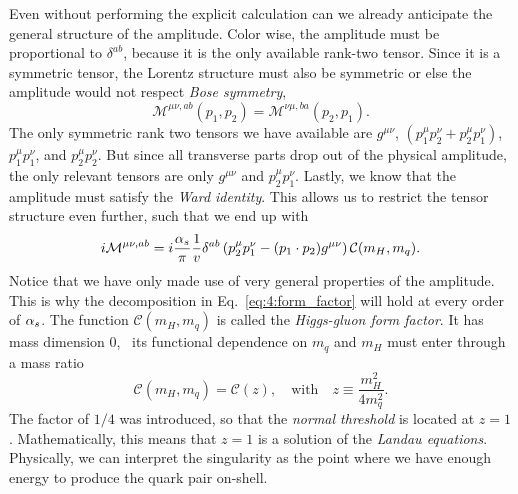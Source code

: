 Even without performing the explicit calculation can we already anticipate the general structure of the amplitude. Color wise, the amplitude must be proportional to $\delta^{ab}$, because it is the only available rank-two tensor. Since it is a symmetric tensor, the Lorentz structure must also be symmetric or else the amplitude would not respect \textit{Bose symmetry}, \ie\
\begin{equation}
\mathcal{M}^{\mu \nu, ab} (p_1, p_2) = \mathcal{M}^{\nu \mu, ba } (p_2, p_1).
\end{equation}
The only symmetric rank two tensors we have available are $g^{\mu\nu}$, $(p_1^\mu p_2^\nu + p_2^\mu p_1^\nu)$, $p_1^\mu p_1^\nu$, and $p_2^\mu p_2^\nu$. But since all transverse parts drop out of the physical amplitude, the only relevant tensors are only $g^{\mu \nu}$ and $p_2^\mu p_1^\nu$. Lastly, we know that the amplitude must satisfy the \textit{Ward identity}. This allows us to restrict the tensor structure even further, such that we end up with
\begin{equation}
i \mathcal{M}^{\mu \nu, ab} = i\frac{\alpha_s}{\pi} \frac{1}{v} \delta^{ab} \left(p_2^\mu p_1^\nu - (p_1 \cdot p_2)g^{\mu\nu} \right) \mathcal{C}(m_H, m_q).
\label{eq:4:form_factor}
\end{equation}
Notice that we have only made use of very general properties of the amplitude. This is why the decomposition in Eq.~\eqref{eq:4:form_factor} will hold at every order of $\alpha_s$. The function $\mathcal{C}(m_H, m_q)$ is called the \textit{Higgs-gluon form factor}. It has mass dimension 0, \ie\ its functional dependence on $m_q$ and $m_H$ must enter through a mass ratio
\begin{equation}
\mathcal{C} (m_H, m_q) = \mathcal{C}(z), \quad \text{with} \quad z \equiv \frac{m_H^2}{4 m_q^2}.
\end{equation}
The factor of $1/4$ was introduced, so that the \textit{normal threshold} is located at $z = 1$. Mathematically, this means that $z = 1$ is a solution of the \textit{Landau equations}. Physically, we can interpret the singularity as the point where we have enough energy to produce the quark pair on-shell.

